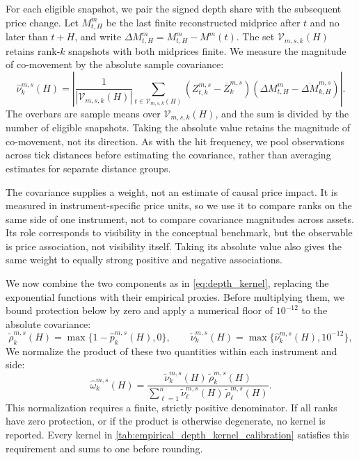 \documentclass[11pt]{article}
\begin{document}
For each eligible snapshot, we pair the signed depth share with the subsequent price change. Let $M^m_{t,H}$ be the last finite reconstructed midprice after $t$ and no later than $t+H$, and write $\Delta M^m_{t,H}=M^m_{t,H}-M^m(t)$. The set $\mathcal{V}_{m,s,k}(H)$ retains rank-$k$ snapshots with both midprices finite. We measure the magnitude of co-movement by the absolute sample covariance:
\begin{equation}
    \widehat\nu^{m,s}_{k}(H)
    =
    \left|
        \frac{1}{|\mathcal{V}_{m,s,k}(H)|}
        \sum_{t\in\mathcal{V}_{m,s,k}(H)}
        \left(Z^{m,s}_{t,k}-\overline Z^{m,s}_{k}\right)
        \left(\Delta M^m_{t,H}-\overline{\Delta M}^{m,s}_{k,H}\right)
    \right|.
    \label{eq:empirical_visibility_covariance}
\end{equation}
The overbars are sample means over $\mathcal{V}_{m,s,k}(H)$, and the sum is divided by the number of eligible snapshots.
Taking the absolute value retains the magnitude of co-movement, not its direction. As with the hit frequency, we pool
observations across tick distances before estimating the covariance, rather than averaging estimates for separate
distance groups.

The covariance supplies a weight, not an estimate of causal price impact. It is measured in instrument-specific price
units, so we use it to compare ranks on the same side of one instrument, not to compare covariance magnitudes across assets.
Its role corresponds to visibility in the conceptual benchmark, but the observable is price association, not visibility itself. Taking its absolute value also gives the same weight to equally strong positive and negative associations.

We now combine the two components as in \cref{eq:depth_kernel}, replacing the exponential functions with their empirical
proxies. Before multiplying them, we bound protection below by zero and apply a numerical floor of $10^{-12}$ to the
absolute covariance:
\begin{equation}
    \widetilde\rho^{m,s}_{k}(H)=\max\{1-\widehat p^{m,s}_{k}(H),0\},
    \qquad
    \widetilde\nu^{m,s}_{k}(H)=\max\{\widehat\nu^{m,s}_{k}(H),10^{-12}\},
    \label{eq:empirical_kernel_floors}
\end{equation}
We normalize the product of these two quantities within each instrument and side:
\begin{equation}
    \widehat\omega^{m,s}_{k}(H)
    =
    \frac{
        \widetilde\nu^{m,s}_{k}(H)\,\widetilde\rho^{m,s}_{k}(H)
    }{
        \sum_{\ell=1}^{n}\widetilde\nu^{m,s}_{\ell}(H)\,\widetilde\rho^{m,s}_{\ell}(H)
    }.
    \label{eq:empirical_depth_kernel}
\end{equation}
This normalization requires a finite, strictly positive denominator. If all ranks have zero protection, or if the product
is otherwise degenerate, no kernel is reported. Every kernel in \cref{tab:empirical_depth_kernel_calibration} satisfies
this requirement and sums to one before rounding.
\end{document}
